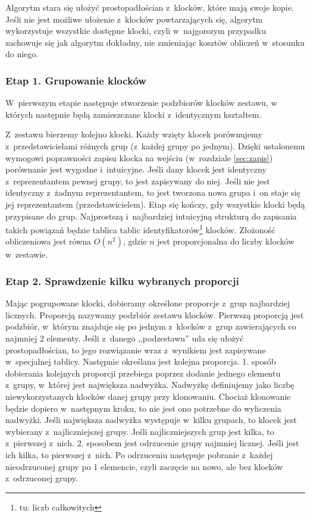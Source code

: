 \documentclass[12pt]{article}
\begin{document}
Algorytm stara się ułożyć prostopadłościan z~klocków, które mają swoje
kopie. Jeśli nie jest możliwe ułożenie z~klocków powtarzających się,
algorytm wykorzystuje wszystkie dostępne klocki, czyli w~najgorszym
przypadku zachowuje się jak algorytm dokładny, nie zmieniając kosztów
obliczeń w~stosunku do niego.

\subsubsection{Etap 1. Grupowanie klocków}
W~pierwszym etapie następuje stworzenie podzbiorów klocków zestawu, w
których następnie będą zamieszczane klocki z~identycznym kształtem.

Z~zestawu bierzemy kolejno klocki. Każdy wzięty klocek porównujemy
z~przedstawicielami różnych grup (z~każdej grupy po jednym). Dzięki
ustalonemu wymogowi poprawności zapisu klocka na wejściu (w~rozdziale
\ref{sec:zapis}) porównanie jest wygodne i~intuicyjne. Jeśli dany klocek
jest identyczny z~reprezentantem pewnej grupy, to jest zapisywany do niej.
Jeśli nie jest identyczny z~żadnym reprezentantem, to jest tworzona nowa
grupa i~on staje się jej reprezentantem (przedstawicielem). Etap się
kończy, gdy wszystkie klocki będą przypisane do grup. Najprostszą
i~najbardziej intuicyjną strukturą do zapisania takich powiązań będzie
tablica tablic identyfikatorów\footnote{tu: liczb całkowitych} klocków.
Złożoność obliczeniowa jest równa $O(n^2)$, gdzie $n$ jest proporcjonalna
do liczby klocków w~zestawie.

\subsubsection{Etap 2. Sprawdzenie kilku wybranych proporcji}
Mając pogrupowane klocki, dobieramy określone proporcje z~grup
najbardziej licznych. Proporcją nazywamy podzbiór zestawu klocków.
Pierwszą proporcją jest podzbiór, w~którym znajduje się po jednym
z~klocków z~grup zawierających co najmniej 2 elementy. Jeśli z~danego
,,podzestawu'' uda się ułożyć prostopadłościan, to jego rozwiązanie
wraz z~wynikiem jest zapisywane w~specjalnej tablicy. Następnie określana
jest kolejna proporcja. 1. sposób dobierania kolejnych proporcji przebiega
poprzez dodanie jednego elementu z~grupy, w~której jest największa
nadwyżka. Nadwyżkę definiujemy jako liczbę niewykorzystanych klocków danej
grupy przy klonowaniu. Chociaż klonowanie będzie dopiero w~następnym
kroku, to nie jest ono potrzebne do wyliczenia nadwyżki. Jeśli największa
nadwyżka występuje w~kilku grupach, to klocek jest wybierany
z~najliczniejszej grupy. Jeśli najliczniejszych grup jest kilka, to
z~pierwszej z~nich. 2. sposobem jest odrzucenie grupy najmniej licznej.
Jeśli jest ich kilka, to pierwszej z~nich. Po odrzuceniu następuje pobranie
z~każdej nieodrzuconej grupy po 1 elemencie, czyli zaczęcie na nowo, ale
bez klocków z~odrzuconej grupy.
\end{document}
